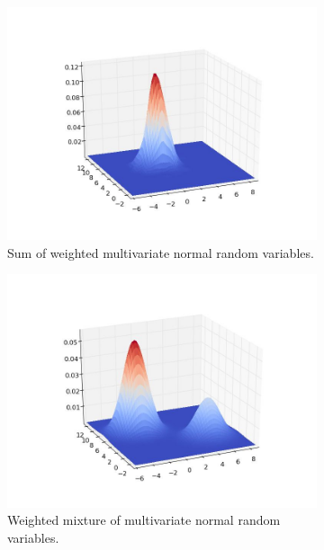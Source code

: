 \begin{figure}[h]
\centering
	\begin{subfigure}[b]{.49\textwidth}
		\centering
		\includegraphics[width=\textwidth]{figures/sum.jpeg}
		\caption{Sum of weighted multivariate normal random variables.}
	\end{subfigure}
	\begin{subfigure}[b]{.49\textwidth}
		\centering
		\includegraphics[width=\textwidth]{figures/gmm.jpeg}
		\caption{Weighted mixture of multivariate normal random variables.}
	\end{subfigure}
    \caption{}
	\label{fig:gmm-threedplots}
\end{figure}


